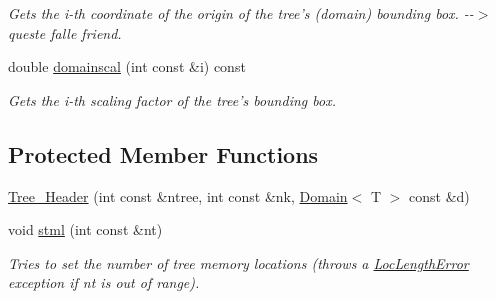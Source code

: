 \begin{DoxyCompactItemize}
\begin{DoxyCompactList}\small\item\em Gets the i-\/th coordinate of the origin of the tree's (domain) bounding box. -\/-\/$>$ queste falle friend. \item\end{DoxyCompactList}\item 
\hypertarget{classTree__Header_aa9e681ec8d883f09ba7ff72b2455dfbf}{
double \hyperlink{classTree__Header_aa9e681ec8d883f09ba7ff72b2455dfbf}{domainscal} (int const \&i) const }
\label{classTree__Header_aa9e681ec8d883f09ba7ff72b2455dfbf}

\begin{DoxyCompactList}\small\item\em Gets the i-\/th scaling factor of the tree's bounding box. \item\end{DoxyCompactList}\end{DoxyCompactItemize}
\subsection*{Protected Member Functions}
\begin{DoxyCompactItemize}
\item 
\hyperlink{classTree__Header_a49b84b2440c27da71ae944cb94d8d856}{Tree\_\-Header} (int const \&ntree, int const \&nk, \hyperlink{classDomain}{Domain}$<$ T $>$ const \&d)
\item 
\hypertarget{classTree__Header_a104a3f95557ea8f3152737e1af13fa6c}{
void \hyperlink{classTree__Header_a104a3f95557ea8f3152737e1af13fa6c}{stml} (int const \&nt)}
\label{classTree__Header_a104a3f95557ea8f3152737e1af13fa6c}

\begin{DoxyCompactList}\small\item\em Tries to set the number of tree memory locations (throws a \hyperlink{classLocLengthError}{LocLengthError} exception if nt is out of range). \item\end{DoxyCompactList}\end{DoxyCompactItemize}

